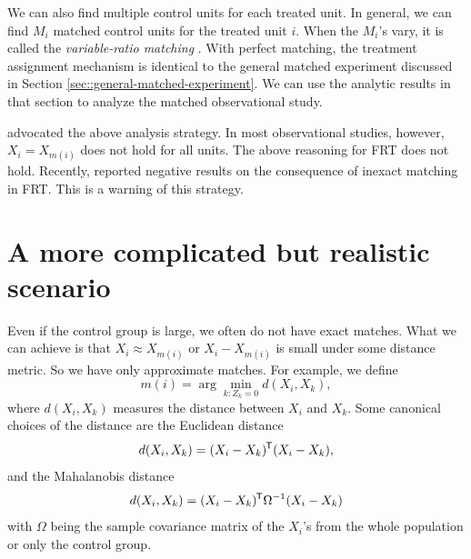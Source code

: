 We can also find multiple control units for each treated unit. In general, we can find $M_i$ matched control units for the treated unit $i$. When the $M_i$'s vary, it is called the {\it variable-ratio matching} \citep{ming2000substantial, ming2001note, pimentel2015variable}. With perfect matching, the treatment assignment mechanism is identical to the general matched experiment discussed in Section \ref{sec::general-matched-experiment}. We can use the analytic results in that section to analyze the matched observational study. 


\citet{rosenbaum2002design} advocated the above analysis strategy. In most observational studies, however, $X_i = X_{m(i)}$ does not hold for all units. The above reasoning for FRT does not hold.  Recently, \citet{guo2022statistical} reported negative results on the consequence of inexact matching in FRT. This is a warning of this strategy. 
 


\section{A more complicated but realistic scenario}

Even if the control group is large, we often do not have exact matches. What we can achieve is that $X_i \approx X_{m(i)}  $ or $X_i -X_{m(i)} $ is small under some distance metric. So we have only approximate matches. For example, we define
$$
m(i) = \arg\min_{k:Z_k = 0} d(X_i ,X_k), 
$$
where $d(X_i ,X_k)$ measures the distance between $X_i$ and $X_k$. Some canonical choices of the distance are the Euclidean distance
$$
d(X_i ,X_k) =  (X_i - X_k)^{\mkern-1.5mu\mathsf{T}} ( X_i - X_k),
$$
and the Mahalanobis distance
$$
d(X_i ,X_k) =(X_i - X_k)^{\mkern-1.5mu\mathsf{T}} \Omega^{-1} (X_i - X_k)
$$
with $\Omega$ being the sample covariance matrix of the $X_i$'s from the whole population or only the control group. 


